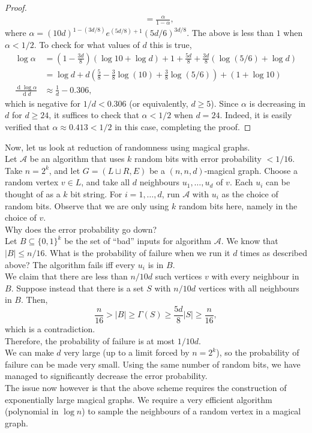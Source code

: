 \documentclass{article}
\begin{document}
\begin{proof}
\begin{align*}
				&= \frac{\alpha}{1-\alpha},
		\end{align*}
		where $\alpha = (10d)^{1-(3d/8)} e^{(5d/8)+1} (5d/6)^{3d/8}$. The above is less than $1$ when $\alpha < 1/2$. To check for what values of $d$ this is true,
		\begin{align*}
			\log \alpha &= \left(1-\frac{3d}{8}\right)(\log 10 + \log d) + 1 + \frac{5d}{8} + \frac{3d}{8}\left(\log(5/6) + \log d\right) \\
				&= \log d + d \left( \frac{5}{8} - \frac{3}{8}\log(10) + \frac{3}{8}\log(5/6) \right) + (1+\log 10) \\
			\frac{\operatorname{d} \log \alpha}{\operatorname{d} d} &\approx \frac{1}{d} - 0.306,
		\end{align*}
		which is negative for $1/d < 0.306$ (or equivalently, $d \ge 5$). Since $\alpha$ is decreasing in $d$ for $d \ge 24$, it suffices to check that $\alpha < 1/2$ when $d=24$. Indeed, it is easily verified that $\alpha \approx 0.413 < 1/2$ in this case, completing the proof.
	\end{proof}

	Now, let us look at reduction of randomness using magical graphs.\\
	Let $\mathcal{A}$ be an algorithm that uses $k$ random bits with error probability $<1/16$. Take $n=2^k$, and let $G=(L\sqcup R,E)$ be a $(n,n,d)$-magical graph. Choose a random vertex $v\in L$, and take all $d$ neighbours $u_1,\ldots,u_d$ of $v$. Each $u_i$ can be thought of as a $k$ bit string. For $i=1,\ldots,d$, run $\mathcal{A}$ with $u_i$ as the choice of random bits. Observe that we are only using $k$ random bits here, namely in the choice of $v$.\\
	
	Why does the error probability go down?\\
	Let $B \subseteq \{0,1\}^k$ be the set of ``bad'' inputs for algorithm $\mathcal{A}$. We know that $|B| \le n/16$. What is the probability of failure when we run it $d$ times as described above? The algorithm fails iff every $u_i$ is in $B$.\\
	We claim that there are less than $n/10d$ such vertices $v$ with every neighbour in $B$. Suppose instead that there is a set $S$ with $n/10d$ vertices with all neighbours in $B$. Then,
	\[ \frac{n}{16} > |B| \ge \Gamma(S) \ge \frac{5d}{8}|S| \ge \frac{n}{16}, \]
	which is a contradiction.\\
	Therefore, the probability of failure is at most $1/10d$.\\
	We can make $d$ very large (up to a limit forced by $n = 2^k$), so the probability of failure can be made very small. Using the same number of random bits, we have managed to significantly decrease the error probability.\\
	The issue now however is that the above scheme requires the construction of exponentially large magical graphs. We require a very efficient algorithm (polynomial in $\log n$) to sample the neighbours of a random vertex in a magical graph.

\end{document}
